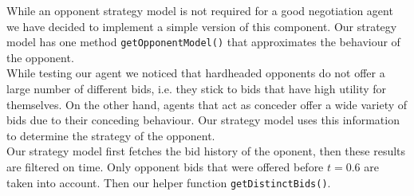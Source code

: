 
While an opponent strategy model is not required for a good negotiation agent we have decided to implement a simple version of this component. Our strategy model has one method \texttt{getOpponentModel()} that approximates the behaviour of the opponent. \\

While testing our agent we noticed that hardheaded opponents do not offer a large number of different bids, i.e. they stick to bids that have high utility for themselves. On the other hand, agents that act as conceder offer a wide variety of bids due to their conceding behaviour. Our strategy model uses this information to determine the strategy of the opponent. \\

Our strategy model first fetches the bid history of the oponent, then these results are filtered on time. Only opponent bids that were offered before $t=0.6$ are taken into account. Then our helper function \texttt{getDistinctBids()}.